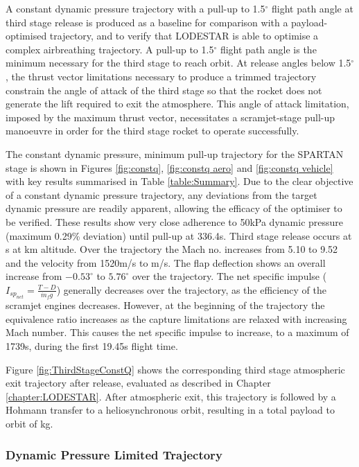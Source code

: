 A constant dynamic pressure trajectory with a pull-up to 1.5$^\circ$ flight path angle at third stage release is produced as a baseline for comparison with a payload-optimised trajectory, and to verify that LODESTAR is able to optimise a complex airbreathing trajectory. A pull-up to 1.5$^\circ$ flight path angle is the minimum necessary for the third stage to reach orbit. At release angles below 1.5$^\circ$, the thrust vector limitations necessary to produce a trimmed trajectory constrain the angle of attack of the third stage so that the rocket does not generate the lift required to exit the atmosphere. This angle of attack limitation, imposed by the maximum thrust vector, necessitates a scramjet-stage pull-up manoeuvre in order for the third stage rocket to operate successfully. 


The constant dynamic pressure, minimum pull-up trajectory for the SPARTAN stage is shown in Figures \ref{fig:constq}, \ref{fig:constq aero} and \ref{fig:constq vehicle} with key results summarised in Table \ref{table:Summary}. Due to the clear objective of a constant dynamic pressure trajectory, any deviations from the target dynamic pressure are readily apparent, allowing the efficacy of the optimiser to be verified. 
These results show very close adherence to 50kPa dynamic pressure (maximum 0.29\% deviation) until pull-up at 336.4s. Third stage release occurs at \FlightTimeConstq s at \SeparationAltConstq km altitude. 
Over the trajectory the Mach no. increases from 5.10 to 9.52 and the velocity from 1520m/s to \SeparationvConstq m/s. The flap deflection shows an overall increase from $-0.53^\circ$ to $5.76^\circ$ over the trajectory.  The net specific impulse ($I_{sp_{net}} = \frac{T-D}{\dot{m}_f g}$) generally decreases over the trajectory, as the efficiency of the scramjet engines decreases. However, at the beginning of the trajectory the equivalence ratio increases as the capture limitations are relaxed with increasing Mach number. This causes the net specific impulse to increase, to a maximum of 1739s, during the first 19.45s flight time. 

Figure \ref{fig:ThirdStageConstQ} shows the corresponding third stage atmospheric exit trajectory after release, evaluated as described in Chapter \ref{chapter:LODESTAR}. After atmospheric exit, this trajectory is followed by a Hohmann transfer to a heliosynchronous orbit, resulting in a total payload to orbit of \PayloadToOrbitConstq kg.



\subsubsection{Dynamic Pressure Limited Trajectory} \label{subsection:50kPalimit}



